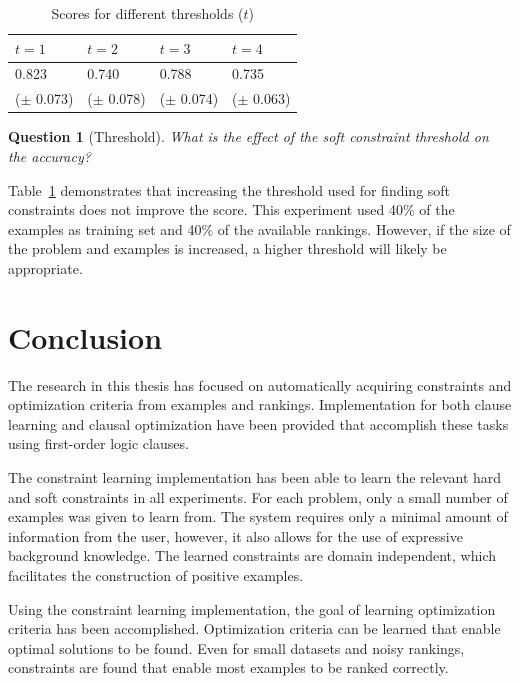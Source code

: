 \documentclass[letterpaper]{article}
\newtheorem{question}{Question}
\theoremstyle{definition}
\begin{document}
  \begin{table}[!htp]
    \caption{Scores for different thresholds ($t$)}
    \begin{tabularx}{\linewidth}{XXXX}
      $t = 1$ & $t = 2$ & $t = 3$ & $t = 4$ \\
      \toprule
     0.823 & 0.740 & 0.788 & 0.735 \\
     ($\pm$ 0.073)&
($\pm$ 0.078)&
($\pm$ 0.074)&
($\pm$ 0.063)
    \end{tabularx}
    \label{tbl:limiet}
  \end{table}

\begin{question}[Threshold]
  What is the effect of the soft constraint threshold on the accuracy?
\end{question}

Table~\ref{tbl:limiet} demonstrates that increasing the threshold used for finding soft constraints does not improve the score.
This experiment used 40\% of the examples as training set and 40\% of the available rankings.
However, if the size of the problem and examples is increased, a higher threshold will likely be appropriate.


\section{Conclusion}
The research in this thesis has focused on automatically acquiring constraints and optimization criteria from examples and rankings.
Implementation for both clause learning and clausal optimization have been provided that accomplish these tasks using first-order logic clauses.

The constraint learning implementation has been able to learn the relevant hard and soft constraints in all experiments.
For each problem, only a small number of examples was given to learn from.
The system requires only a minimal amount of information from the user, however, it also allows for the use of expressive background knowledge.
The learned constraints are domain independent, which facilitates the construction of positive examples.

Using the constraint learning implementation, the goal of learning optimization criteria has been accomplished.
Optimization criteria can be learned that enable optimal solutions to be found.
Even for small datasets and noisy rankings, constraints are found that enable most examples to be ranked correctly.
\end{document}
